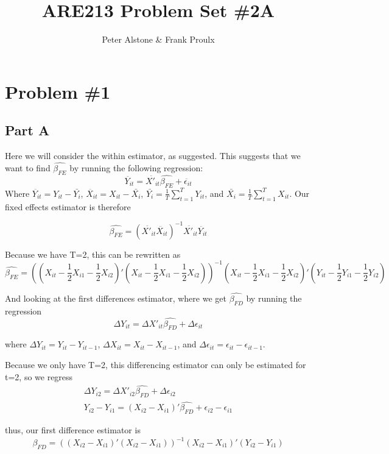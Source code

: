 \documentclass[letterpaper, 12pt]{article}
\begin{document}
\title{ARE213 Problem Set \#2A}
\author{Peter Alstone \& Frank Proulx}
\maketitle

\section{Problem \#1}
\subsection{Part A}
Here we will consider the within estimator, as suggested. This suggests that we want to find $\widehat{\beta_{FE}}$ by running the following regression:
\begin{equation}
\ddot{Y_{it}} = \ddot{X'_{it}}\widehat{\beta_{FE}} + \ddot{\epsilon_{it}}
\end{equation}
Where $\ddot{Y_{it}}=Y_{it}-\bar{Y_i}$, $\ddot{X_{it}}=X_{it}-\bar{X_i}$, $\bar{Y_i}=\frac{1}{T}\sum_{t=1}^TY_{it}$, and $\bar{X_i}=\frac{1}{T}\sum_{t=1}^TX_{it}$.
Our fixed effects estimator is therefore

\begin{equation}
\widehat{\beta_{FE}}=(\ddot{X'_{it}}\ddot{X_{it}})^{-1}\ddot{X'_{it}}\ddot{Y_{it}} %
\end{equation}

Because we have T=2, this can be rewritten as
\begin{equation}
\widehat{\beta_{FE}}=((X_{it}-\frac{1}{2}X_{i1}-\frac{1}{2}X_{i2})'(X_{it}-\frac{1}{2}X_{i1}-\frac{1}{2}X_{i2}))^{-1}(X_{it}-\frac{1}{2}X_{i1}-\frac{1}{2}X_{i2})'(Y_{it}-\frac{1}{2}Y_{i1}-\frac{1}{2}Y_{i2})
\end{equation}




And looking at the first differences estimator, where we get $\widehat{\beta_{FD}}$ by running the regression
\begin{equation}
\Delta Y_{it} = \Delta X'_{it} \widehat{\beta_{FD}} + \Delta \epsilon_{it}
\end{equation}

where $\Delta Y_{it} = Y_{it} - Y_{it-1}$, $\Delta X_{it} = X_{it} - X_{it-1}$, and $\Delta \epsilon_{it} = \epsilon_{it} - \epsilon_{it-1}$.

Because we only have T=2, this differencing estimator can only be estimated for t=2, so we regress
\begin{align}
\Delta Y_{i2} = \Delta X'_{i2} \widehat{\beta_{FD}} + \Delta \epsilon_{i2} \\
Y_{i2}-Y_{i1} = (X_{i2}-X_{i1})'\widehat{\beta_{FD}} + \epsilon_{i2}-\epsilon_{i1}
\end{align}

thus, our first difference estimator is
\begin{equation}
\widehat{\beta_{FD}}=((X_{i2}-X_{i1})'(X_{i2}-X_{i1}))^{-1} (X_{i2}-X_{i1})'(Y_{i2}-Y_{i1})
\end{equation}
\end{document}
